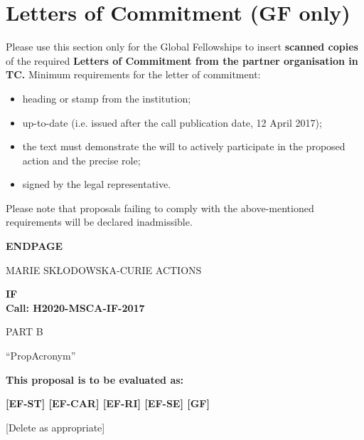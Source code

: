 \newpage
\section{Letters of Commitment (GF only)}
\label{sec:letters}

Please use this section only for the Global Fellowships to insert {\bf scanned copies} of the required {\bf Letters of Commitment from the partner organisation in TC.} 
Minimum requirements for the letter of commitment: 

\begin{itemize}
  \item heading or stamp from the institution; 
  \item up-to-date (i.e. issued after the call publication date, 12 April 2017); 
  \item the text must demonstrate the will to actively participate in the proposed action and the precise role;
  \item signed by the legal representative.
\end{itemize}


\medskip\noindent
Please note that proposals failing to comply with the above-mentioned requirements will be declared inadmissible.





\newpage
\label{sec:endpage}
\vspace{15mm}
\begin{center}


        \Large{
      
     
        \textbf{ENDPAGE}
  
          \vspace{15mm}
          MARIE SK\L{}ODOWSKA-CURIE ACTIONS\\
          \vspace{1cm}
          
          \textbf{\acf{IF}}\\
          \textbf{Call: H2020-MSCA-IF-2017}
          \vspace{2cm}                   

          PART B
          \vspace{2.5cm}

          ``{\sc \ac{PropAcronym}\xspace}''
          \vspace{2cm}

          \textbf{This proposal is to be evaluated as:}
          \vspace{.5cm}

          \textbf{[EF-ST] [EF-CAR] [EF-RI] [EF-SE] [GF]}\\
        }
        \large{[Delete as appropriate]}

  \end{center}
\vspace{1cm}
